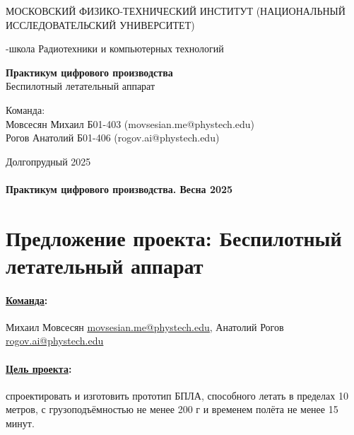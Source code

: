 \documentclass[a4paper,12pt]{article} %
\begin{document}
\begin{titlepage}
\begin{center}
    {\large МОСКОВСКИЙ ФИЗИКО-ТЕХНИЧЕСКИЙ ИНСТИТУТ (НАЦИОНАЛЬНЫЙ ИССЛЕДОВАТЕЛЬСКИЙ УНИВЕРСИТЕТ)}
\end{center}
\begin{center}
    {-школа Радиотехники и компьютерных технологий}
\end{center}

\vspace{3.5cm}

\vspace{0.1cm}
{\huge
\begin{center}
    {\bf Практикум цифрового производства}\\
    {Беспилотный летательный аппарат}
\end{center}
}
\vspace{5cm}
\begin{center}
{
    \LARGE Команда: \\ Мовсесян Михаил Б01-403 (movsesian.me@phystech.edu) \\Рогов Анатолий Б01-406 (rogov.ai@phystech.edu)
}
\end{center}

\vspace{0.5cm}
\begin{center}
    Долгопрудный 2025
\end{center}
\end{titlepage}

\paragraph{Практикум цифрового производства. Весна 2025}
\section*{Предложение проекта: \newline Беспилотный летательный аппарат}

\paragraph{\underline{Команда}:}
Михаил Мовсесян \href{mailto:movsesian.me@phystech.edu}{\underline{movsesian.me@phystech.edu}}, Анатолий Рогов \href{mailto:rogov.ai@phystech.edu}{\underline{rogov.ai@phystech.edu}}

\paragraph{\underline{Цель проекта}:}
спроектировать и изготовить прототип БПЛА, способного летать в пределах 10 метров, с грузоподъёмностью не менее 200 г и временем полёта не менее 15 минут.
\end{document}
